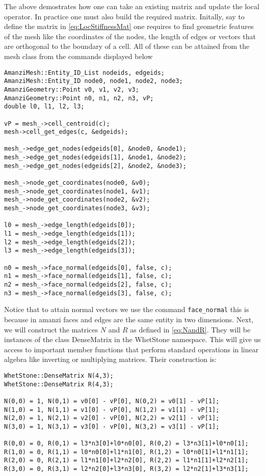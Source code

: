 %
The above demostrates how one can take an existing matrix and update the local operator. 
%
In practice one must also build the required matrix.
%
Initally, say to define the matrix in \eqref{eq:LocStiffnessMat} one requires to find geometric features of the mesh like the coordinates of the nodes, the length of edges or vectors that are orthogonal to the boundary of a cell.
%
All of these can be attained from the mesh class from the commands displayed below
%
\begin{lstlisting}
AmanziMesh::Entity_ID_List nodeids, edgeids;
AmanziMesh::Entity_ID node0, node1, node2, node3;
AmanziGeometry::Point v0, v1, v2, v3;
AmanziGeometry::Point n0, n1, n2, n3, vP;
double l0, l1, l2, l3;

vP = mesh_->cell_centroid(c);
mesh->cell_get_edges(c, &edgeids);

mesh_->edge_get_nodes(edgeids[0], &node0, &node1);
mesh_->edge_get_nodes(edgeids[1], &node1, &node2);
mesh_->edge_get_nodes(edgeids[2], &node2, &node3);

mesh_->node_get_coordinates(node0, &v0);
mesh_->node_get_coordinates(node1, &v1);
mesh_->node_get_coordinates(node2, &v2);  
mesh_->node_get_coordinates(node3, &v3);

l0 = mesh_->edge_length(edgeids[0]);
l1 = mesh_->edge_length(edgeids[1]);
l2 = mesh_->edge_length(edgeids[2]);
l3 = mesh_->edge_length(edgeids[3]);

n0 = mesh_->face_normal(edgeids[0], false, c);
n1 = mesh_->face_normal(edgeids[1], false, c);
n2 = mesh_->face_normal(edgeids[2], false, c);
n3 = mesh_->face_normal(edgeids[3], false, c); 
\end{lstlisting}
%
Notice that to attain normal vectors we use the command {\tt face\_normal} this is because in amanzi faces and edges are the same entity in two dimensions.
%
Next, we will construct the matrices $N$ and $R$ as defined in \eqref{eq:NandR}.
%
They will be instances of the class DenseMatrix in the WhetStone namespace.
%
This will give us access to important member functions that perform standard operations in linear algebra like inverting or multiplying matrices. 
%
Their construction is:
%
\begin{lstlisting}
WhetStone::DenseMatrix N(4,3);
WhetStone::DenseMatrix R(4,3);

N(0,0) = 1, N(0,1) = v0[0] - vP[0], N(0,2) = v0[1] - vP[1];  
N(1,0) = 1, N(1,1) = v1[0] - vP[0], N(1,2) = v1[1] - vP[1];
N(2,0) = 1, N(2,1) = v2[0] - vP[0], N(2,2) = v2[1] - vP[1];
N(3,0) = 1, N(3,1) = v3[0] - vP[0], N(3,2) = v3[1] - vP[1];

R(0,0) = 0, R(0,1) = l3*n3[0]+l0*n0[0], R(0,2) = l3*n3[1]+l0*n0[1];
R(1,0) = 0, R(1,1) = l0*n0[0]+l1*n1[0], R(1,2) = l0*n0[1]+l1*n1[1];
R(2,0) = 0, R(2,1) = l1*n1[0]+l2*n2[0], R(2,2) = l1*n1[1]+l2*n2[1];
R(3,0) = 0, R(3,1) = l2*n2[0]+l3*n3[0], R(3,2) = l2*n2[1]+l3*n3[1];
\end{lstlisting}
